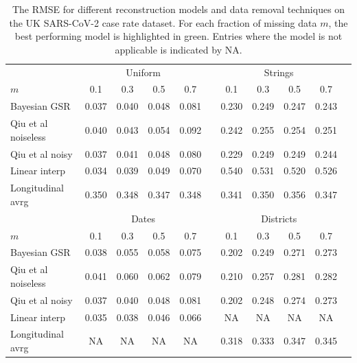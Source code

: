 \begin{table}[t]
    \centering
    \footnotesize 
    \begin{tabular}{lcccccccccc}
    \toprule
    & \multicolumn{4}{c}{Uniform} & \phantom{a} & \multicolumn{4}{c}{Strings} \\
    \cmidrule{2-5} \cmidrule{7-10} 
    $m$ & 0.1   & 0.3 & 0.5 & 0.7 &&  0.1   & 0.3  & 0.5 & 0.7  \\ \midrule \rule{0pt}{0.5cm}
   Bayesian GSR & 0.037 & 0.040 & \colorbox{best!35}{0.048} & 0.081 && 0.230 &  \colorbox{best!35}{0.249} & \colorbox{best!35}{0.247} & \colorbox{best!35}{0.243} \\ \rule{0pt}{6ex} 
    Qiu et al noiseless & 0.040 & 0.043 & 0.054 & 0.092 && 0.242 & 0.255 & 0.254 & 0.251 \\ \rule{0pt}{6ex} 
    Qiu et al noisy & 0.037 & 0.041 & \colorbox{best!35}{0.048} & 0.080 && \colorbox{best!35}{0.229} &  \colorbox{best!35}{0.249} & 0.249 & 0.244 \\ 
    \rule{0pt}{6ex} 
    Linear interp & \colorbox{best!35}{0.034} & \colorbox{best!35}{0.039} &  0.049 & \colorbox{best!35}{0.070} && 0.540 & 0.531 & 0.520 & 0.526 \\ 
    \rule{0pt}{6ex}
    Longitudinal avrg & 0.350 & 0.348 &  0.347 & 0.348 && 0.341 & 0.350 & 0.356 & 0.347  \\[0.2cm] \midrule \rule{0pt}{4ex}
    & \multicolumn{4}{c}{Dates} & \phantom{a} & \multicolumn{4}{c}{Districts} \\
    \cmidrule{2-5} \cmidrule{7-10} 
    $m$ & 0.1   & 0.3 & 0.5 & 0.7 &&  0.1   & 0.3  & 0.5 & 0.7  \\ \midrule \rule{0pt}{0.5cm}
    Bayesian GSR & 0.038 & 0.055 & 0.058 & 0.075  && \colorbox{best!35}{0.202} & 0.249 & \colorbox{best!35}{0.271} & \colorbox{best!35}{0.273} \\ 
    \rule{0pt}{6ex} 
     Qiu et al noiseless & 0.041 & 0.060 & 0.062 & 0.079 && 0.210 &  0.257 & 0.281 & 0.282 \\ \rule{0pt}{6ex} 
    Qiu et al noisy & 0.037 & 0.040 & \colorbox{best!35}{0.048} & 0.081 && \colorbox{best!35}{0.202} &  \colorbox{best!35}{0.248} & 0.274 & \colorbox{best!35}{0.273} \\ \rule{0pt}{6ex} 
    Linear interp & \colorbox{best!35}{0.035} & \colorbox{best!35}{0.038} & \colorbox{best!35}{0.046} & \colorbox{best!35}{0.066} && NA & NA & NA & NA \\ \rule{0pt}{6ex}
    Longitudinal avrg & NA & NA & NA & NA && 0.318 & 0.333 & 0.347 & 0.345 \\[0.2cm] \bottomrule
    \end{tabular}
    \caption[Graph signal reconstruction real data results]{The RMSE for different reconstruction models and data removal techniques on the UK SARS-CoV-2 case rate dataset. For each fraction of missing data $m$, the best performing model is highlighted in green. Entries where the model is not applicable is indicated by NA. }
    \label{tab:gsr_real_data_experiemnts} 
\end{table}


